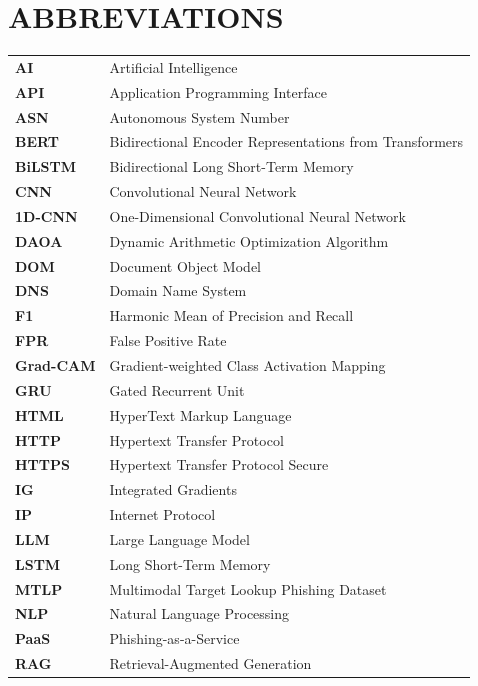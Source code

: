 \chapter*{ABBREVIATIONS}

\begin{singlespace}
\noindent
\renewcommand{\arraystretch}{1.05}
\begin{tabular}{p{2.8cm} p{12.2cm}}
\textbf{AI} & Artificial Intelligence \\
\textbf{API} & Application Programming Interface \\
\textbf{ASN} & Autonomous System Number \\
\textbf{BERT} & Bidirectional Encoder Representations from Transformers \\
\textbf{BiLSTM} & Bidirectional Long Short-Term Memory \\
\textbf{CNN} & Convolutional Neural Network \\
\textbf{1D-CNN} & One-Dimensional Convolutional Neural Network \\
\textbf{DAOA} & Dynamic Arithmetic Optimization Algorithm \\
\textbf{DOM} & Document Object Model \\
\textbf{DNS} & Domain Name System \\
\textbf{F1} & Harmonic Mean of Precision and Recall \\
\textbf{FPR} & False Positive Rate \\
\textbf{Grad-CAM} & Gradient-weighted Class Activation Mapping \\
\textbf{GRU} & Gated Recurrent Unit \\
\textbf{HTML} & HyperText Markup Language \\
\textbf{HTTP} & Hypertext Transfer Protocol \\
\textbf{HTTPS} & Hypertext Transfer Protocol Secure \\
\textbf{IG} & Integrated Gradients \\
\textbf{IP} & Internet Protocol \\
\textbf{LLM} & Large Language Model \\
\textbf{LSTM} & Long Short-Term Memory \\
\textbf{MTLP} & Multimodal Target Lookup Phishing Dataset \\
\textbf{NLP} & Natural Language Processing \\
\textbf{PaaS} & Phishing-as-a-Service \\
\textbf{RAG} & Retrieval-Augmented Generation \\

\end{tabular}
\end{singlespace}
